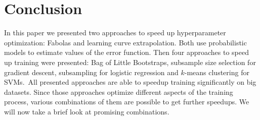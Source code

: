 \section{Conclusion}%
\label{sec:conclusion}

In this paper we presented two approaches to speed up hyperparameter optimization: Fabolas and learning curve extrapolation.
Both use probabilistic models to estimate values of the error function.
Then four approaches to speed up training were presented: Bag of Little Bootstraps, subsample size selection for gradient descent, subsampling for logistic regression and \(k\)-means clustering for SVMs.\
All presented approaches are able to speedup training significantly on big datasets.
Since those approaches optimize different aspects of the training process, various combinations of them are possible to get further speedups.
We will now take a brief look at promising combinations.
